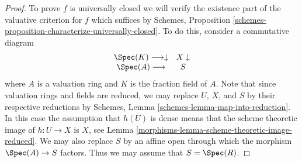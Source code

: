 \begin{proof}

To prove $f$ is universally closed we will verify the existence part of the
valuative criterion for $f$ which suffices by
Schemes, Proposition \ref{schemes-proposition-characterize-universally-closed}.
To do this, consider a commutative diagram
$$
\begin{array}{cc}\Spec(K) \longrightarrow\downarrow & X \downarrow \\ \Spec(A) \longrightarrow & S\end{array}
$$
where $A$ is a valuation ring and $K$ is the fraction field of $A$.
Note that since valuation rings and fields are reduced, we may
replace $U$, $X$, and $S$ by their respective reductions
by Schemes, Lemma \ref{schemes-lemma-map-into-reduction}.
In this case the assumption that $h(U)$ is dense means that
the scheme theoretic image of $h : U \to X$ is $X$, see
Lemma \ref{morphisms-lemma-scheme-theoretic-image-reduced}.
We may also replace $S$ by an affine open through which
the morphism $\Spec(A) \to S$ factors. Thus we may
assume that $S = \Spec(R)$.


\end{proof}
